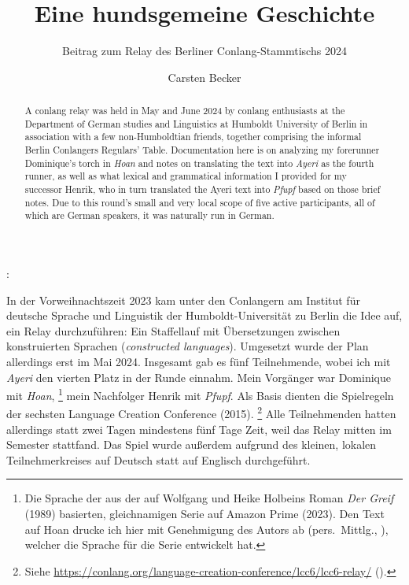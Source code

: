 \documentclass[
	12pt,
	ngerman,
]{scrartcl}
\author{Carsten Becker}
\title{Eine hundsgemeine Geschichte}
\subtitle{Beitrag zum Relay des Berliner Conlang-Stammtischs 2024}
\date{\DTMdate{2024-06-08}} %
\let\q\textquote
\newcommand{\fw}[1]{\textit{#1}} %
\newcommand{\tit}[1]{\textit{#1}} %
\newenvironment{mytitle}{
	\hfill
	\begin{minipage}{0.667\textwidth}
	\vspace{\baselineskip}
	\begin{center}
		\Large
		\sffamily\bfseries
		\makeatletter
}{
		\makeatother
	\end{center}
	\vspace{1em}
	\end{minipage}
	\hfill
}
\begin{document}

\begin{mytitle}
	\@title: \@subtitle
\end{mytitle}

\begin{abstract}
A conlang relay was held in May and June 2024 by conlang enthusiasts at the
Department of German studies and Linguistics at Humboldt University of Berlin
in association with a few non-Humboldtian friends, together comprising the
informal Berlin Conlangers Regulars' Table. Documentation here is on analyzing
my forerunner Dominique's torch in \tit{Hoan} and notes on translating the text
into \tit{Ayeri} as the fourth runner, as well as what lexical and grammatical
information I provided for my successor Henrik, who in turn translated the
Ayeri text into \tit{Pfupf} based on those brief notes. Due to this round's
small and very local scope of five active participants, all of which are German
speakers, it was naturally run in German.
\end{abstract}

In der Vorweihnachtszeit 2023 kam unter den Conlangern am Institut für deutsche
Sprache und Linguistik der Humboldt-Universität zu Berlin die Idee auf, ein
Relay durchzuführen: Ein Staffellauf mit Übersetzungen zwischen konstruierten
Sprachen (\fw{constructed languages}). Umgesetzt wurde der Plan allerdings erst
im Mai 2024. Insgesamt gab es fünf Teilnehmende, wobei ich mit \tit{Ayeri} den
vierten Platz in der Runde einnahm. Mein Vorgänger war Dominique mit
\tit{Hoan},%
%
	\footnote{Die Sprache der \q{Gehörnten} aus der auf Wolfgang und Heike
	Holbeins Roman \tit{Der Greif} (1989) basierten, gleichnamigen Serie auf
	Amazon Prime (2023). Den Text auf Hoan drucke ich hier mit Genehmigung des
	Autors ab (pers.~Mittlg., ), welcher die Sprache für
	die Serie entwickelt hat.}
%
mein Nachfolger Henrik mit \tit{Pfupf}. Als Basis dienten die Spielregeln der
sechsten Language Creation Conference (2015).%
%
	\footnote{Siehe
	\url{https://conlang.org/language-creation-conference/lcc6/lcc6-relay/}
	().}
%
Alle Teilnehmenden hatten allerdings statt zwei Tagen mindestens fünf Tage
Zeit, weil das Relay mitten im Semester stattfand. Das Spiel wurde außerdem
aufgrund des kleinen, lokalen Teilnehmerkreises auf Deutsch statt auf Englisch
durchgeführt.

\end{document}
